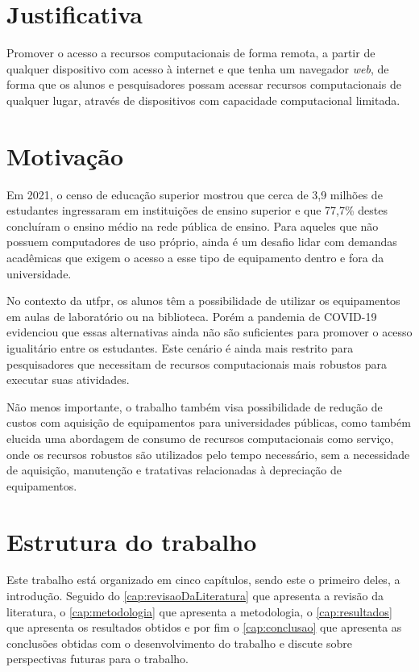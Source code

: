 \section{Justificativa}
\label{sec:justificativa}

Promover o acesso a recursos computacionais de forma remota, a partir de qualquer dispositivo com acesso à internet e que tenha um navegador \textit{web}, de forma que os alunos e pesquisadores possam acessar recursos computacionais de qualquer lugar, através de dispositivos com capacidade computacional limitada.

\section{Motivação}

Em 2021, o censo de educação superior mostrou que cerca de 3,9 milhões de estudantes ingressaram em instituições de ensino superior e que 77,7\% destes concluíram o ensino médio na rede pública de ensino. \citep{inep2021}
Para aqueles que não possuem computadores de uso próprio, ainda é um desafio lidar com demandas acadêmicas que exigem o acesso a esse tipo de equipamento dentro e fora da universidade.

No contexto da \gls{utfpr}, os alunos têm a possibilidade de utilizar os equipamentos em aulas de laboratório ou na biblioteca. Porém a pandemia de COVID-19 evidenciou que essas alternativas ainda não são suficientes para promover o acesso igualitário entre os estudantes. Este cenário é ainda mais restrito para pesquisadores que necessitam de recursos computacionais mais robustos para executar suas atividades.

Não menos importante, o trabalho também visa possibilidade de redução de custos com aquisição de equipamentos para universidades públicas, como também elucida uma abordagem de consumo de recursos computacionais como serviço, onde os recursos robustos são utilizados pelo tempo necessário, sem a necessidade de aquisição, manutenção e tratativas relacionadas à depreciação de equipamentos.

\section{Estrutura do trabalho}
\label{sec:estruturaTrabalho}

Este trabalho está organizado em cinco capítulos, sendo este o primeiro deles, a introdução. Seguido do \autoref{cap:revisaoDaLiteratura} que apresenta a revisão da literatura, o \autoref{cap:metodologia} que apresenta a metodologia, o \autoref{cap:resultados} que apresenta os resultados obtidos e por fim o \autoref{cap:conclusao} que apresenta as conclusões obtidas com o desenvolvimento do trabalho e discute sobre perspectivas futuras para o trabalho.

